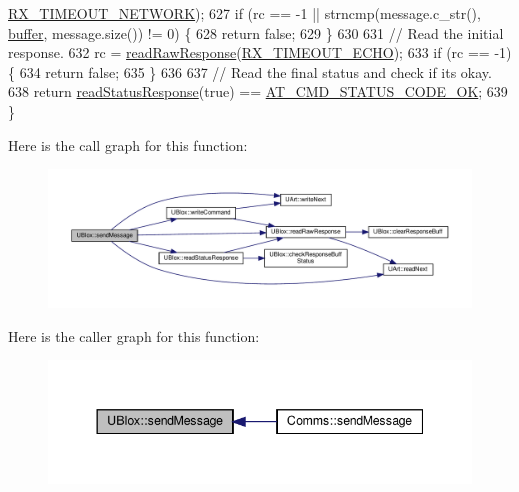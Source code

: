 \begin{DoxyCode}
      \hyperlink{_u_blox_8cpp_abebe8ab49e0adc150976b59995d9b2cd}{RX\_TIMEOUT\_NETWORK});
627     \textcolor{keywordflow}{if} (rc == -1 || strncmp(message.c\_str(), \hyperlink{class_u_blox_a6ca4b90f3dc4e856181dce1ebda6f82c}{buffer}, message.size()) != 0) \{
628         \textcolor{keywordflow}{return} \textcolor{keyword}{false};
629     \}
630 
631     \textcolor{comment}{// Read the initial response.}
632     rc = \hyperlink{class_u_blox_ab4a7ab4b8922d91e23f273ae160c1bed}{readRawResponse}(\hyperlink{_u_blox_8cpp_a55092c0742d15bb08a5ea7db5a25440e}{RX\_TIMEOUT\_ECHO});
633     \textcolor{keywordflow}{if} (rc == -1) \{
634         \textcolor{keywordflow}{return} \textcolor{keyword}{false};
635     \}
636 
637     \textcolor{comment}{// Read the final status and check if its okay.}
638     \textcolor{keywordflow}{return} \hyperlink{class_u_blox_a4eaca5b1b1c4b5b6f6164b220dd43e0b}{readStatusResponse}(\textcolor{keyword}{true}) == \hyperlink{_u_blox_8cpp_a6ebc1682eb6b9964fccb4a61688ff307}{AT\_CMD\_STATUS\_CODE\_OK};
639 \}
\end{DoxyCode}
Here is the call graph for this function\+:
\nopagebreak
\begin{figure}[H]
\begin{center}
\leavevmode
\includegraphics[width=350pt]{da/df6/class_u_blox_a946f2903bb01a62cd5bdef423eaa9750_cgraph}
\end{center}
\end{figure}
Here is the caller graph for this function\+:
\nopagebreak
\begin{figure}[H]
\begin{center}
\leavevmode
\includegraphics[width=344pt]{da/df6/class_u_blox_a946f2903bb01a62cd5bdef423eaa9750_icgraph}
\end{center}
\end{figure}
\mbox{\label{class_u_blox_aabed44fd41e16c9d1a8daba80f3bef06}} 

